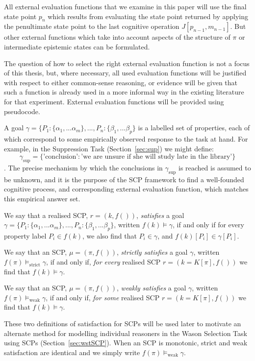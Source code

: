All external evaluation functions that we examine in this paper will use the final state point $p_n$ which results from evaluating the state point returned by applying the penultimate state point to the last cognitive operation $J[p_{n-1},m_{n-1}]$. But other external functions which take into account aspects of the structure of $\pi$ or intermediate epistemic states can be formulated.

The question of how to select the right external evaluation function is not a focus of this thesis, but, where necessary, all used evaluation functions will be justified with respect to either common-sense reasoning, or evidence will be given that such a function is already used in a more informal way in the existing literature for that experiment. External evaluation functions will be provided using pseudocode.

A goal $\gamma=\{P_1:\{\alpha_1,...\alpha_m\},...,P_n:\{\beta_1,...\beta_p\}$ is a labelled set of properties, each of which correspond to some empirically observed response to the task at hand. For example, in the Suppression Task (Section~\ref{sec:sup}) we might define:
\[
\gamma_\text{sup}=\{\text{'conclusion'}:\text{'we are unsure if she will study late in the library'}\}
\].
The precise mechanism by which the conclusions in $\gamma_\text{sup}$ is reached is assumed to be unknown, and it is the purpose of the SCP framework to find a well-founded cognitive process, and corresponding external evaluation function, which matches this empirical answer set.

We say that a realised SCP, $r=(k,f())$, \textit{satisfies} a goal $\gamma=\{P_1:\{\alpha_1,...\alpha_m\},...,P_n:\{\beta_1,...\beta_p\}$, written $f(k)\models \gamma$, if and only if for every property label $P_i \in f(k)$, we also find that $P_i \in \gamma$, and $f(k)[P_i]\in \gamma[P_i]$.

We say that an SCP, $\mu=(\pi,f())$, \textit{strictly satisfies} a goal $\gamma$, written $f(\pi)\models_\text{strict} \gamma$, if and only if, \textit{for every} realised SCP $r=(k=K[\pi],f())$ we find that $f(k) \models \gamma$.

We say that an SCP, $\mu=(\pi,f())$, \textit{weakly satisfies} a goal $\gamma$, written $f(\pi)\models_\text{weak} \gamma$, if and only if, \textit{for some} realised SCP $r=(k=K[\pi],f())$ we find that $f(k) \models \gamma$.

These two definitions of satisfaction for SCPs will be used later to motivate an alternate method for modelling individual reasoners in the Wason Selection Task using SCPs (Section~\ref{sec:wstSCP}). When an SCP is monotonic, strict and weak satisfaction are identical and we simply write $f(\pi)\models_\text{weak} \gamma$.

